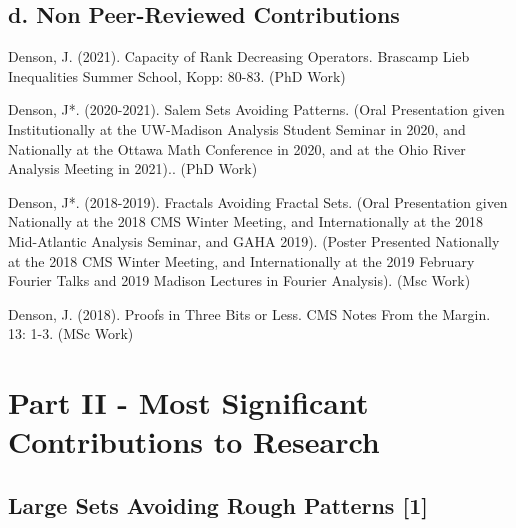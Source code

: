 \documentclass[12pt]{article}
\theoremstyle{plain}
\theoremstyle{remark}
\theoremstyle{definition}
\begin{document}
\subsection*{d. Non Peer-Reviewed Contributions}

\begin{thebibliography}{9}

\makeatletter
\addtocounter{\@listctr}{3}
\makeatother

Denson, J. (2021). Capacity of Rank Decreasing Operators. Brascamp Lieb Inequalities Summer School, Kopp: 80-83. (PhD Work)


Denson, J*. (2020-2021). Salem Sets Avoiding Patterns. (Oral Presentation given Institutionally at the UW-Madison Analysis Student Seminar in 2020, and Nationally at the Ottawa Math Conference in 2020, and at the Ohio River Analysis Meeting in 2021).. (PhD Work)

Denson, J*. (2018-2019). Fractals Avoiding Fractal Sets. (Oral Presentation given Nationally at the 2018 CMS Winter Meeting, and Internationally at the 2018 Mid-Atlantic Analysis Seminar, and GAHA 2019). (Poster Presented Nationally at the 2018 CMS Winter Meeting, and Internationally at the 2019 February Fourier Talks and 2019 Madison Lectures in Fourier Analysis). (Msc Work)

Denson, J. (2018). Proofs in Three Bits or Less. CMS Notes From the Margin. 13: 1-3. (MSc Work)

\end{thebibliography}

\section*{Part II - Most Significant Contributions to Research}

\subsection*{Large Sets Avoiding Rough Patterns [1]}
\end{document}
